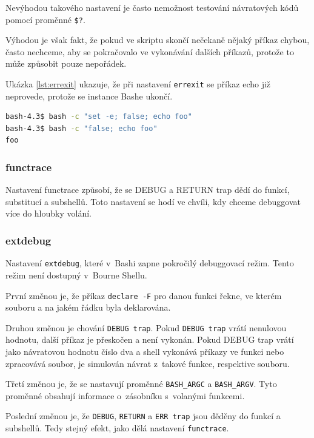 \documentclass[thesis=M,czech]{FITthesis}[2012/06/26]
\begin{document}
Nevýhodou takového nastavení je často nemožnost testování návratových kódů pomocí proměnné \texttt{\$?}.

Výhodou je však fakt, že pokud ve skriptu skončí nečekaně nějaký příkaz chybou, často nechceme, aby se pokračovalo ve vykonávání dalších příkazů, protože to může způsobit pouze nepořádek.

Ukázka \ref{lst:errexit} ukazuje, že při nastavení \texttt{errexit} se příkaz echo již neprovede, protože se instance Bashe ukončí.

\noindent
\begin{minipage}{\linewidth}
\begin{lstlisting}[language=bash, caption={\texttt{errexit}}, label={lst:errexit}]
bash-4.3$ bash -c "set -e; false; echo foo"
bash-4.3$ bash -c "false; echo foo"
foo
\end{lstlisting}
\end{minipage}

%
%
%
\subsubsection{functrace}

Nastavení functrace způsobí, že se DEBUG a RETURN trap dědí do funkcí, substitucí a subshellů. Toto nastavení se hodí ve chvíli, kdy chceme debuggovat více do hloubky volání.

%
%
%
\subsubsection{extdebug}

Nastavení \texttt{extdebug}, které v~Bashi zapne pokročilý debuggovací režim. Tento režim není dostupný v~Bourne Shellu.

První změnou je, že příkaz \texttt{declare -F} pro danou funkci řekne, ve kterém souboru a na jakém řádku byla deklarována.

Druhou změnou je chování \texttt{DEBUG trap}. Pokud \texttt{DEBUG trap} vrátí nenulovou hodnotu, další příkaz je přeskočen a není vykonán. Pokud DEBUG trap vrátí jako návratovou hodnotu číslo dva a shell vykonává příkazy ve funkci nebo zpracovává soubor, je simulován návrat z~takové funkce, respektive souboru.

Třetí změnou je, že se nastavují proměnné \texttt{BASH\_ARGC} a \texttt{BASH\_ARGV}. Tyto proměnné obsahují informace o~zásobníku s~volanými funkcemi.

Poslední změnou je, že \texttt{DEBUG}, \texttt{RETURN} a \texttt{ERR trap} jsou děděny do funkcí a subshellů. Tedy stejný efekt, jako dělá nastavení \texttt{functrace}.
\end{document}
